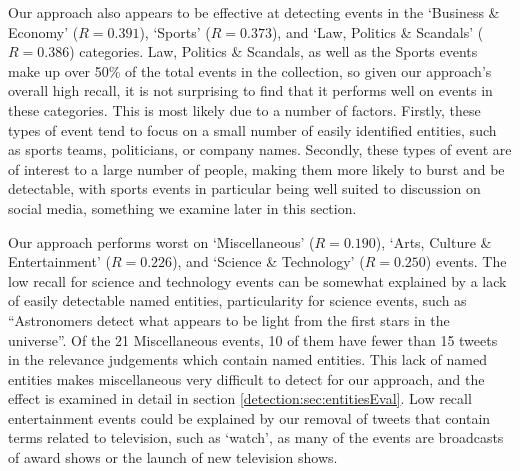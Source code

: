Our approach also appears to be effective at detecting events in the `Business \& Economy' ($R=0.391$), `Sports' ($R=0.373$), and `Law, Politics \& Scandals' ($R=0.386$) categories.
Law, Politics \& Scandals, as well as the Sports events make up over 50\% of the total events in the collection, so given our approach's overall high recall, it is not surprising to find that it performs well on events in these categories.
This is most likely due to a number of factors. Firstly, these types of event tend to focus on a small number of easily identified entities, such as sports teams, politicians, or company names.
Secondly, these types of event are of interest to a large number of people, making them more likely to burst and be detectable, with sports events in particular being well suited to discussion on social media, something we examine later in this section.

Our approach performs worst on `Miscellaneous' ($R=0.190$), `Arts, Culture \& Entertainment' ($R=0.226$), and `Science \& Technology' ($R=0.250$) events.
The low recall for science and technology events can be somewhat explained by a lack of easily detectable named entities, particularity for science events, such as ``Astronomers detect what appears to be light from the first stars in the universe''. Of the 21 Miscellaneous events, 10 of them have fewer than 15 tweets in the relevance judgements which contain named entities.
This lack of named entities makes miscellaneous very difficult to detect for our approach, and the effect is examined in detail in section \ref{detection:sec:entitiesEval}.
Low recall entertainment events could be explained by our removal of tweets that contain terms related to television, such as `watch', as many of the events are broadcasts of award shows or the launch of new television shows.

